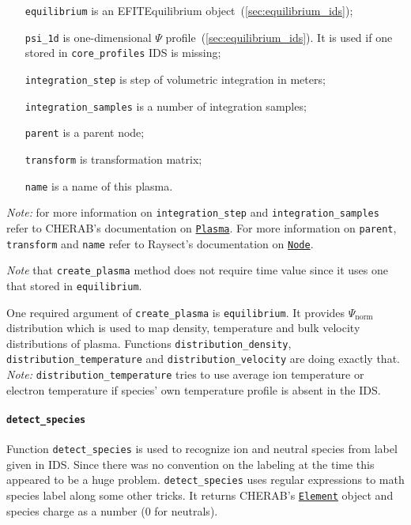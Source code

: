 \documentclass[../../main.tex]{subfiles}
\begin{document}
\begin{itemize}[align=left]
    \item[\texttt{equilibrium}] is an EFITEquilibrium object~(\cref{sec:equilibrium_ids});
    \item[\texttt{psi\_1d}] is one-dimensional $\Psi$ profile~(\cref{sec:equilibrium_ids}). It is used if one stored in \texttt{core\_profiles} IDS is missing;
    \item[\texttt{integration\_step}] is step of volumetric integration in meters;
    \item[\texttt{integration\_samples}] is a number of integration samples;
    \item[\texttt{parent}] is a parent node;
    \item[\texttt{transform}] is transformation matrix;
    \item[\texttt{name}] is a name of this plasma.
\end{itemize}
\emph{Note: } for more information on \texttt{integration\_step} and \texttt{integration\_samples} refer to CHERAB's documentation on \href{https://cherab.github.io/documentation/plasmas/core_plasma_classes.html?highlight=plasma#cherab.core.Plasma}{\texttt{Plasma}}.
For more information on \texttt{parent}, \texttt{transform} and \texttt{name} refer to Raysect's documentation on \href{https://raysect.github.io/documentation/api_reference/core/raysect_core_scenegraph.html?highlight=node#raysect.core.scenegraph.node.Node}{\texttt{Node}}.

\emph{Note} that \texttt{create\_plasma} method does not require time value since it uses one that stored in \texttt{equilibrium}.

One required argument of \texttt{create\_plasma} is \texttt{equilibrium}. It provides $\Psi_\text{norm}$ distribution which is used to map density, temperature and bulk velocity distributions of plasma. Functions \texttt{distribution\_density}, \texttt{distribution\_temperature} and \texttt{distribution\_velocity} are doing exactly that. \emph{Note:} \texttt{distribution\_temperature} tries to use average ion temperature or electron temperature if species' own temperature profile is absent in the IDS.

\paragraph{\texttt{detect\_species}}%
\label{par:detect_species}

Function \texttt{detect\_species} is used to recognize ion and neutral species from label given in IDS. Since there was no convention on the labeling at the time this appeared to be a huge problem. \texttt{detect\_species} uses regular expressions to math species label along some other tricks. It returns CHERAB's \href{https://cherab.github.io/documentation/atomic/elements_and_isotopes.html?highlight=element#cherab.core.atomic.elements.Element}{\texttt{Element}} object and species charge as a number (0 for neutrals).
\end{document}
